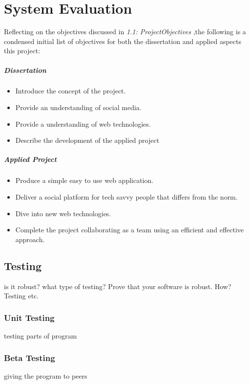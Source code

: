 \chapter{System Evaluation} \label{eval}
Reflecting on the objectives discussed in \textit{1.1: ProjectObjectives} ,the following is a condensed initial list of objectives for both the dissertation and applied aspects this project: 

\paragraph{Dissertation}
\begin{itemize}
\item Introduce the concept of the project. 
\item Provide an understanding of social media.
\item Provide a understanding of web technologies.
\item Describe the development of the applied project
\end{itemize}
 
 \paragraph{Applied Project}
\begin{itemize}
\item Produce a simple easy to use web application.
\item Deliver a social platform for tech savvy people that differs from the norm.
\item Dive into new web technologies.
\item Complete the project collaborating as a team using an efficient and effective approach.
\end{itemize}

\section{Testing}
is it robust?
what type of testing?
 Prove that your software is robust. How? Testing etc. 
\subsection{Unit Testing}
testing parts of program
\subsection{Beta Testing}
giving the program to peers

